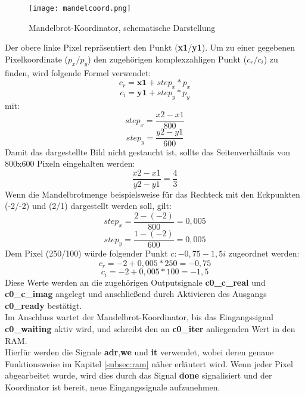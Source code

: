 \documentclass[a4paper,12pt,onesided]{report}
\begin{document}
\begin{figure}[H]
	\centering
	\texttt{[image: mandelcoord.png]}
	\caption{Mandelbrot-Koordinator, schematische Darstellung}
	\label{fig:mandelcoordpixels}
\end{figure}
Der obere linke Pixel repräsentiert den Punkt (\textbf{x1}/\textbf{y1}).
Um zu einer gegebenen Pixelkoordinate ($p_x/p_y$) den zugehörigen komplexzahligen Punkt ($c_r/c_i$) zu finden, wird folgende Formel verwendet:
\[c_r = \mathbf{x1} + step_x * p_x\] 
\[c_i = \mathbf{y1} + step_y * p_y\]
mit:
\[step_x = \frac{x2-x1}{800}\]
\[step_y = \frac{y2-y1}{600}\]
Damit das dargestellte Bild nicht gestaucht ist, sollte das Seitenverhältnis von 800x600 Pixeln eingehalten werden:
\[\frac{x2-x1}{y2-y1}=\frac{4}{3}\]
Wenn die Mandelbrotmenge beispielsweise für das Rechteck mit den Eckpunkten (-2/-2) und (2/1) dargestellt werden soll, gilt:
\[step_x = \frac{2-(-2)}{800} = 0,005\]
\[step_y = \frac{1-(-2)}{600} = 0,005\]
Dem Pixel (250/100) würde folgender Punkt $c: -0,75 -1,5i$ zugeordnet werden:
\[c_r = -2 + 0,005 * 250 = -0,75\] 
\[c_i = -2 + 0,005 * 100 = -1,5\]
Diese Werte werden an die zugehörigen Outputsignale \textbf{c0\_c\_real} und \textbf{c0\_c\_imag} angelegt und anschließend durch Aktivieren des Ausgangs \textbf{c0\_ready} bestätigt.\\
Im Anschluss wartet der Mandelbrot-Koordinator, bis das Eingangssignal \textbf{c0\_waiting} aktiv wird, und schreibt den an \textbf{c0\_iter} anliegenden Wert in den RAM.\\
Hierfür werden die Signale \textbf{adr},\textbf{we} und \textbf{it} verwendet, wobei deren genaue Funktionsweise im Kapitel \autoref{subsec:ram} näher erläutert wird.
Wenn jeder Pixel abgearbeitet wurde, wird dies durch das Signal \textbf{done} signalisiert und der Koordinator ist bereit, neue Eingangssignale aufzunehmen.\\
\end{document}
